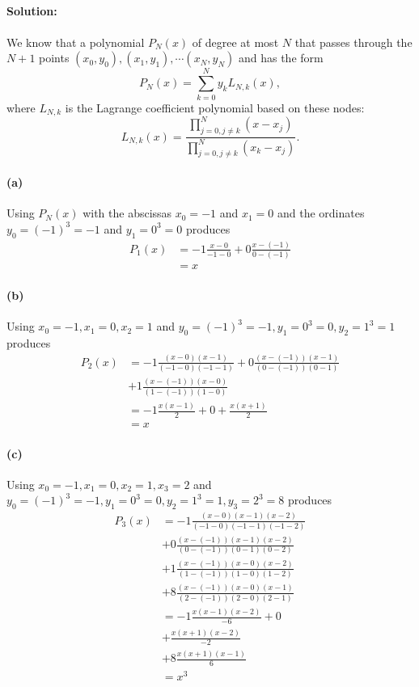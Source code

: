 \documentclass{article}  %
\begin{document}
        \paragraph{Solution:}
        \paragraph{}We know that a polynomial $P_N(x)$ of degree at most $N$ that passes through the $N + 1$ points $(x_0, y_0), (x_1, y_1), \cdots (x_N, y_N)$ and has the form
        $$P_N(x) = \sum_{k=0}^{N}y_kL_{N,k}(x),$$
        where $L_{N,k}$ is the Lagrange coefficient polynomial based on these nodes:
        $$L_{N, k}(x) = \frac{\prod_{j=0, j \ne k}^N(x - x_j)}{\prod_{j=0, j \ne k}^N(x_k - x_j)}.$$
        \paragraph{(a)}Using $P_N(x)$ with the abscissas $x_0 = -1$ and $x_1 = 0$ and the ordinates $y_0 = (-1)^3= -1$ and $y_1 = 0^3 = 0$ produces
        \begin{align*}
          P_1(x) &= -1\frac{x - 0}{-1 - 0} + 0\frac{x - (-1)}{0 - (-1)}\\
          &= x
        \end{align*}
        \paragraph{(b)}Using $x_0 = -1, x_1 = 0, x_2 = 1$ and $y_0 = (-1)^3 = -1, y_1 = 0^3 = 0, y_2 = 1^3 = 1$ produces
        \begin{align*}
          P_2(x) &= -1\frac{(x - 0)(x - 1)}{(-1 - 0)(-1 - 1)} + 0\frac{(x - (-1))(x - 1)}{(0 - (-1))(0 - 1)}\\
          &+ 1\frac{(x - (-1))(x - 0)}{(1 - (-1))(1 - 0)}\\
          &= -1\frac{x(x-1)}{2} + 0 + \frac{x(x+1)}{2} \\
          &= x
        \end{align*}
        \paragraph{(c)}Using $x_0 = -1, x_1 = 0, x_2 = 1, x_3 = 2$ and $y_0 = (-1)^3 = -1, y_1 = 0^3 = 0, y_2 = 1^3 = 1, y_3 = 2^3 = 8$ produces
        \begin{align*}
          P_3(x) &= -1\frac{(x - 0)(x - 1)(x - 2)}{(-1 - 0)(-1 - 1)(-1 - 2)} \\
          &+ 0\frac{(x - (-1))(x - 1)(x - 2)}{(0 - (-1))(0 - 1)(0 - 2)} \\
          &+ 1\frac{(x - (-1))(x - 0)(x - 2)}{(1 - (-1))(1 - 0)(1 - 2)} \\
          &+ 8\frac{(x - (-1))(x - 0)(x - 1)}{(2 - (-1))(2 - 0)(2 - 1)} \\
          &= -1\frac{x(x - 1)(x - 2)}{-6} + 0 \\
          &+ \frac{x(x + 1)(x - 2)}{-2} \\
          &+ 8\frac{x(x + 1)(x - 1)}{6} \\
          &= x^3
        \end{align*}
\end{document}
